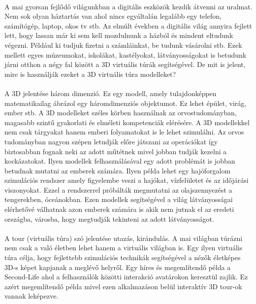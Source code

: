 	\paragraph{}
	A mai gyorsan fejlődő világunkban a digitális eszközök kezdik átvenni az uralmat. Nem sok olyan háztartás van ahol nincs egyáltalán legalább egy telefon, számítógép, laptop, okos tv stb. Az elmúlt években a digitális világ annyira fejlett lett, hogy lassan már ki sem kell mozdulnunk a házból és mindent eltudunk végezni. Például ki tudjuk fizetni a számláinkat, be tudunk vásárolni stb. Ezek mellett egyes múzeumokat, iskolákat, kastélyokat, látványosságokat is betudunk járni otthon a négy fal között a 3D virtuális túrák segítségével. De mit is jelent, mire is használják ezeket a 3D virtuális túra modelleket?
	\paragraph{}
	A 3D jelentése három dimenzió. Ez egy modell, amely tulajdonképpen matematikailag ábrázol egy háromdimenziós objektumot. Ez lehet épület, virág, ember stb. A 3D modelleket széles körben használnak az orvostudományban, magasabb szintű gyakorlati és elméleti kompetenciák elérésére. A 3D modellekkel nem csak tárgyakat hanem emberi folyamatokat is le lehet szimulálni. Az orvos tudományban nagyon szépen letudják előre játszani az operációkat így biztosabban fognak neki az adott műtétnek mivel jobban tudják kezelni a kockázatokat. Ilyen modellek felhasználásával egy adott problémát is jobban betudnak mutatni az emberek számára. Ilyen példa lehet egy hajóforgalom szimulációs rendszer amely figyelembe veszi a hajókat, vízfelületet és az időjárási viszonyokat. Ezzel a rendszerrel próbálták megmutatni az olajszennyezést a tengerekben, óceánokban.\cite{dedov2017design} Ezen modellek segítségével a világ látványosságai elérhetővé válhatnak azon emberek számára is akik nem jutnak el az eredeti országba, városba, hogy megtudják tekinteni az adott látványosságot.
	\paragraph{}
	A tour (virtuális túra) szó jelentése utazás, kirándulás. A mai világban túrázni nem csak a való életben lehet hanem a virtuális világban is. Egy ilyen virtuális túra célja, hogy fejlettebb szimulációs technikák segítségével a nézők életképes 3D-s képet kapjanak a meglévő helyről. Egy híres és megemlítendő példa a Second-Life ahol a felhasználók közötti interakció avatárokon keresztül zajlik. Ez azért megemlítendő példa mivel ezen alkalmazáson belül interaktív 3D tour-ok vannak leképezve.\cite{moloo20163d}
